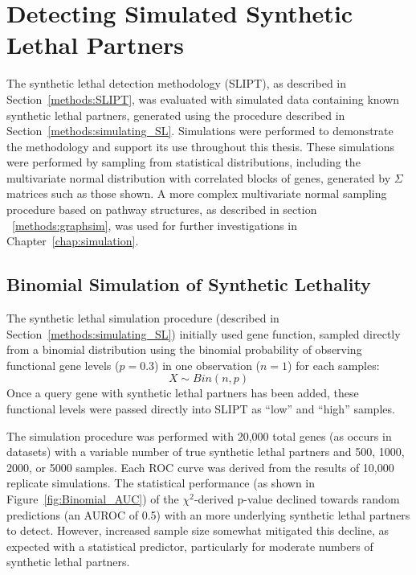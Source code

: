 \FloatBarrier

\section{Detecting Simulated Synthetic Lethal Partners} \label{chapt2:simulation_2015}

The \gls{synthetic lethal} detection methodology (\gls{SLIPT}), as described in Section~\ref{methods:SLIPT}, was evaluated with simulated data containing known \gls{synthetic lethal} partners, generated using the procedure described in Section~\ref{methods:simulating_SL}. Simulations were performed to demonstrate the methodology and support its use throughout this thesis. These simulations were performed by sampling from statistical distributions, including the multivariate normal distribution with correlated blocks of genes, generated by $\Sigma$ matrices such as those shown. A more complex multivariate normal sampling procedure based on pathway  structures, as described in section ~\ref{methods:graphsim}, was used for further investigations in Chapter~\ref{chap:simulation}. 

\subsection{Binomial Simulation of Synthetic Lethality} \label{chapt2:simulation_binom}

The \gls{synthetic lethal} simulation procedure (described in Section~\ref{methods:simulating_SL}) initially used gene function, sampled directly from a binomial distribution using the binomial probability of observing functional gene levels ($p = 0.3$) in one observation ($n = 1$) for each samples: $$X\sim Bin(n,p)$$  Once a query gene with \gls{synthetic lethal} partners has been added, these functional levels were passed directly into \gls{SLIPT} as ``low'' and ``high'' samples.

The simulation procedure was performed with 20,000 total genes (as occurs in  datasets) with a variable number of true \gls{synthetic lethal} partners and 500, 1000, 2000, or 5000 samples. Each \gls{ROC} curve was derived from the results of 10,000 replicate simulations. The statistical performance (as shown in Figure~\ref{fig:Binomial_AUC}) of the $\chi^2$-derived p-value declined towards random predictions (an \gls{AUROC} of 0.5) with an more underlying \gls{synthetic lethal} partners to detect. However, increased sample size somewhat mitigated this decline, as expected with a statistical predictor, particularly for moderate numbers of \gls{synthetic lethal} partners. 

